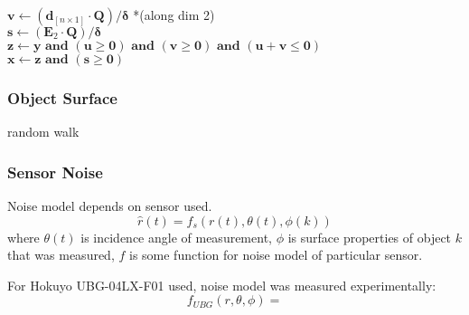 \begin{algorithm}
{		$\mathbf{v} \longleftarrow (\mathbf{d}_{[n \times 1]} \cdot \mathbf{Q})/\bm{\delta}$ *(along dim 2)\\
		$\mathbf{s} \longleftarrow (\mathbf{E}_2 \cdot \mathbf{Q})/\bm{\delta}$\\
		$\mathbf{z} \longleftarrow \mathbf{y} \textbf{ and } (\mathbf{u} \geq \mathbf{0}) 
		\textbf{ and } (\mathbf{v} \geq \mathbf{0}) \textbf{ and } (\mathbf{u}+\mathbf{v} \leq 
		\mathbf{0})$\\
		$\mathbf{x} \longleftarrow \mathbf{z} \textbf{ and } (\mathbf{s} \geq \mathbf{0})$\\
	}
	\caption{M{\"o}ller-Trumbore ray-triangle intersection\label{MTalg}}
	\end{algorithm}
	
	\subsubsection{Object Surface}
	random walk
	
	\subsubsection{Sensor Noise}
	Noise model depends on sensor used.
	\begin{equation}
		\hat{r}(t) = f_s(r(t),\theta(t),\phi(k))
	\end{equation}
	where $\theta(t)$ is incidence angle of measurement, $\phi$ is surface properties of object $k$ that was measured, $f$ is some function for noise model of particular sensor.
	
	For Hokuyo UBG-04LX-F01 used, noise model was measured experimentally:
	\begin{equation}
		f_{UBG}(r,\theta,\phi) = 
	\end{equation}
	
